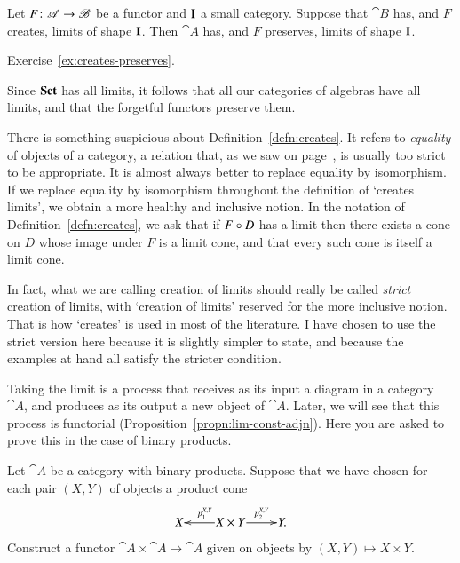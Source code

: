 \begin{lemma}   
\label{lemma:creates-preserves}
Let $F \from \cat{A} \to \cat{B}$ be a functor and $\mathbf{I}$ a small
category.  Suppose that $\cat{B}$ has, and $F$ creates, limits of shape
$\mathbf{I}$.  Then $\cat{A}$ has, and $F$ preserves, limits of shape
$\mathbf{I}$. 
\end{lemma}

\begin{pf}
Exercise~\ref{ex:creates-preserves}.
\end{pf}

Since $\mathbf{Set}$ has all limits, it follows that all our categories of algebras
have all limits, and that the forgetful functors preserve them.

\begin{remark}
There is something suspicious about Definition~\ref{defn:creates}.  It
refers to \emph{equality} of objects of a category, a relation that, as we
saw on page~\pageref{p:care}, is usually too strict to be appropriate.  It
is almost always better to replace equality by isomorphism.  If we replace
equality by isomorphism throughout the definition of `creates limits', we
obtain a more healthy and inclusive notion.  In the notation of
Definition~\ref{defn:creates}, we ask that if $F \mathbin{\circ} D$ has a limit then
there exists a cone on $D$ whose image under $F$ is a limit cone, and that
every such cone is itself a limit cone.  

In fact, what we are calling creation of limits should really be called
\emph{strict} creation of limits, with `creation of limits' reserved for
the more inclusive notion.  That is how `creates' is used in most of the
literature.  I have chosen to use the strict version here because it is
slightly simpler to state, and because the examples at hand all satisfy the
stricter condition.
%
%
%
%
%
%
\end{remark}


\exs


\begin{question}        
\label{ex:prod-Set-functorial}
Taking the limit is a process that receives as its input a diagram in a
category $\cat{A}$, and produces as its output a new object of $\cat{A}$.
Later, we will see that this process is functorial%
%
%
(Proposition~\ref{propn:lim-const-adjn}).  Here you are asked to prove this
in the case of binary products.%
%
%

Let $\cat{A}$ be a category with binary products.  Suppose that we have chosen
for each pair $(X, Y)$ of objects a product cone
\[
\xymatrix@1{
X       &X \times Y \ar[l]_{p^{X, Y}_1} \ar[r]^-{p^{X, Y}_2}     &Y.
}
\]
Construct a functor $\cat{A} \times \cat{A} \to \cat{A}$ given on objects
by $(X, Y) \mapsto X \times Y$.
\end{question}


